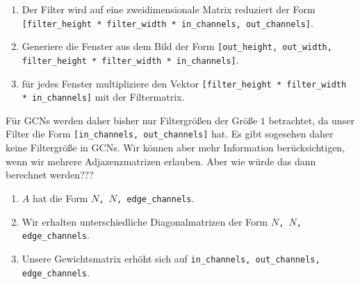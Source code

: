 \documentclass{scrartcl}
\begin{document}
\begin{enumerate}
  \item Der Filter wird auf eine zweidimensionale Matrix reduziert der Form \texttt{[filter\_height * filter\_width * in\_channels, out\_channels]}.
  \item Generiere die Fenster aus dem Bild der Form \texttt{[out\_height, out\_width, filter\_height * filter\_width * in\_channels]}.
  \item für jedes Fenster multipliziere den Vektor \texttt{[filter\_height * filter\_width * in\_channels]} mit der Filtermatrix.
\end{enumerate}

Für GCNs werden daher bisher nur Filtergrößen der Größe $1$ betrachtet, da unser Filter die Form \texttt{[in\_channels, out\_channels]} hat.
Es gibt sogesehen daher keine Filtergröße in GCNs.
Wir können aber mehr Information berücksichtigen, wenn wir mehrere Adjazenzmatrizen erlauben.
Aber wie würde das dann berechnet werden???

\begin{enumerate}
  \item $A$ hat die Form \texttt{$N$, $N$, edge\_channels}.
  \item Wir erhalten unterschiedliche Diagonalmatrizen der Form \texttt{$N$, $N$, edge\_channels}.
  \item Unsere Gewichtsmatrix erhöht sich auf \texttt{in\_channels, out\_channels, edge\_channels}.
\end{enumerate}
\end{document}
